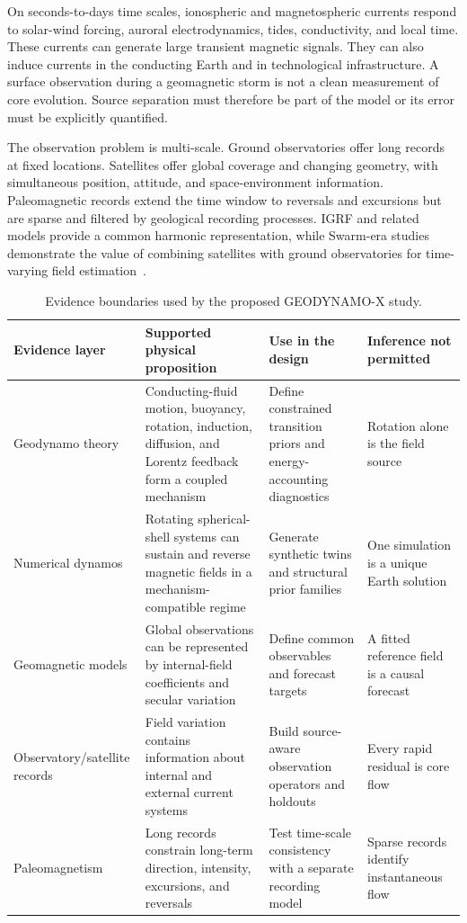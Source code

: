 \documentclass[conference]{IEEEtran}
\begin{document}
On seconds-to-days time scales, ionospheric and magnetospheric currents respond to solar-wind forcing, auroral electrodynamics, tides, conductivity, and local time. These currents can generate large transient magnetic signals. They can also induce currents in the conducting Earth and in technological infrastructure. A surface observation during a geomagnetic storm is not a clean measurement of core evolution. Source separation must therefore be part of the model or its error must be explicitly quantified.

The observation problem is multi-scale. Ground observatories offer long records at fixed locations. Satellites offer global coverage and changing geometry, with simultaneous position, attitude, and space-environment information. Paleomagnetic records extend the time window to reversals and excursions but are sparse and filtered by geological recording processes. IGRF and related models provide a common harmonic representation, while Swarm-era studies demonstrate the value of combining satellites with ground observatories for time-varying field estimation~\cite{alken,finlay}.

\begin{table}[t]
\centering
\caption{Evidence boundaries used by the proposed GEODYNAMO-X study.}
\label{tab:evidence}
\small
\begin{tabular}{P{2.7cm}P{4.3cm}P{5.0cm}P{3.0cm}}
\toprule
Evidence layer & Supported physical proposition & Use in the design & Inference not permitted \\
\midrule
Geodynamo theory & Conducting-fluid motion, buoyancy, rotation, induction, diffusion, and Lorentz feedback form a coupled mechanism & Define constrained transition priors and energy-accounting diagnostics & Rotation alone is the field source \\
Numerical dynamos & Rotating spherical-shell systems can sustain and reverse magnetic fields in a mechanism-compatible regime & Generate synthetic twins and structural prior families & One simulation is a unique Earth solution \\
Geomagnetic models & Global observations can be represented by internal-field coefficients and secular variation & Define common observables and forecast targets & A fitted reference field is a causal forecast \\
Observatory/satellite records & Field variation contains information about internal and external current systems & Build source-aware observation operators and holdouts & Every rapid residual is core flow \\
Paleomagnetism & Long records constrain long-term direction, intensity, excursions, and reversals & Test time-scale consistency with a separate recording model & Sparse records identify instantaneous flow \\
\bottomrule
\end{tabular}
\end{table}
\end{document}
